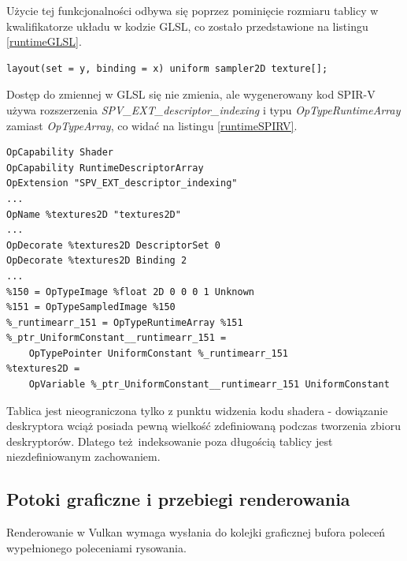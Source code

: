 Użycie tej funkcjonalności odbywa się poprzez pominięcie rozmiaru tablicy w kwalifikatorze układu w kodzie GLSL, co zostało przedstawione na listingu \ref{runtimeGLSL}.
\lstset{language=GLSL}
\begin{lstlisting}[caption={Kwalifikator układu dla nieograniczonej tablicy tekstur},captionpos=b,label={runtimeGLSL}]
layout(set = y, binding = x) uniform sampler2D texture[];
\end{lstlisting}
Dostęp do zmiennej w GLSL się nie zmienia, ale wygenerowany kod SPIR-V używa rozszerzenia \textit{SPV\_EXT\_descriptor\_indexing} i typu \textit{OpTypeRuntimeArray} zamiast \textit{OpTypeArray}, co widać na listingu \ref{runtimeSPIRV}.
\lstset{language=SPIRV}
\begin{lstlisting}[caption={Kod SPIR-V wygenerowany dla nieograniczonej tablicy deskryptorów},captionpos=b,label={runtimeSPIRV}]
OpCapability Shader
OpCapability RuntimeDescriptorArray
OpExtension "SPV_EXT_descriptor_indexing"
...
OpName %textures2D "textures2D"
...
OpDecorate %textures2D DescriptorSet 0
OpDecorate %textures2D Binding 2
...
%150 = OpTypeImage %float 2D 0 0 0 1 Unknown
%151 = OpTypeSampledImage %150
%_runtimearr_151 = OpTypeRuntimeArray %151
%_ptr_UniformConstant__runtimearr_151 =
	OpTypePointer UniformConstant %_runtimearr_151
%textures2D =
	OpVariable %_ptr_UniformConstant__runtimearr_151 UniformConstant
\end{lstlisting}

Tablica jest nieograniczona tylko z punktu widzenia kodu shadera - dowiązanie deskryptora wciąż posiada pewną wielkość zdefiniowaną podczas tworzenia zbioru deskryptorów. Dlatego też indeksowanie poza długością tablicy jest niezdefiniowanym zachowaniem.



\subsection{Potoki graficzne i przebiegi renderowania}

Renderowanie w Vulkan wymaga wysłania do kolejki graficznej bufora poleceń wypełnionego poleceniami rysowania.

